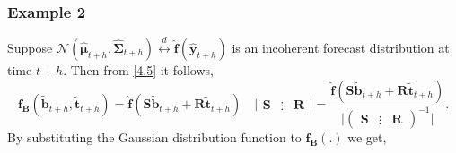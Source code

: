 \documentclass[a4paper, 11pt]{article}
\begin{document}
	\subsubsection*{Example 2}
	
	Suppose $\mathscr{N}(\hat{\bm{\mu}}_{t+h}, \hat{\bm{\Sigma}}_{t+h}) \overset{d}{\leftrightarrow} \hat{\bm{f}}(\hat{\bm{y}}_{t+h})$ is an incoherent forecast distribution at time $t+h$. Then from \eqref{4.5} it follows,
	\begin{equation*}
	\bm{f_B}(\tilde{\bm{b}}_{t+h},\tilde{\bm{t}}_{t+h})=\hat{\bm{f}}(\bm{S}\tilde{\bm{b}}_{t+h}+\bm{R}\tilde{\bm{t}}_{t+h}) \quad \Big|\begin{array}{ccc}\bm{S} & \vdots& \bm{R}\end{array}\Big| = \frac{\hat{\bm{f}}(\bm{S}\tilde{\bm{b}}_{t+h}+\bm{R}\tilde{\bm{t}}_{t+h}) }{\Big|(\begin{array}{ccc}\bm{S} & \vdots& \bm{R}\end{array})^{-1} \Big|}.
	\end{equation*}
	By substituting the Gaussian distribution function to $\bm{f_B}(.)$ we get,
\end{document}
